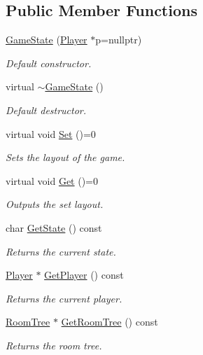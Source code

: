 \subsection*{Public Member Functions}
\begin{DoxyCompactItemize}
\item 
\hyperlink{classGameState_a3d3d1f24fc9da8a9b2a1b081ac559c06}{Game\-State} (\hyperlink{classPlayer}{Player} $\ast$p=nullptr)
\begin{DoxyCompactList}\small\item\em Default constructor. \end{DoxyCompactList}\item 
virtual \hyperlink{classGameState_a517ef6eaba96896259fcefd0c66afc9e}{$\sim$\-Game\-State} ()
\begin{DoxyCompactList}\small\item\em Default destructor. \end{DoxyCompactList}\item 
virtual void \hyperlink{classGameState_af22e9a43999f99b784a35fab85cd9208}{Set} ()=0
\begin{DoxyCompactList}\small\item\em Sets the layout of the game. \end{DoxyCompactList}\item 
virtual void \hyperlink{classGameState_a4283cb3aa5637d4815d64272843a0625}{Get} ()=0
\begin{DoxyCompactList}\small\item\em Outputs the set layout. \end{DoxyCompactList}\item 
char \hyperlink{classGameState_a80d734fcbd886d8a0ce8e3191e770b3a}{Get\-State} () const 
\begin{DoxyCompactList}\small\item\em Returns the current state. \end{DoxyCompactList}\item 
\hyperlink{classPlayer}{Player} $\ast$ \hyperlink{classGameState_abcc93b8f1949ae4a39a5324b93d9291a}{Get\-Player} () const 
\begin{DoxyCompactList}\small\item\em Returns the current player. \end{DoxyCompactList}\item 
\hyperlink{classRoomTree}{Room\-Tree} $\ast$ \hyperlink{classGameState_a9659c39e354a27c0de9f09e27a05aa9d}{Get\-Room\-Tree} () const 
\begin{DoxyCompactList}\small\item\em Returns the room tree. \end{DoxyCompactList}\item 

\end{DoxyCompactItemize}
